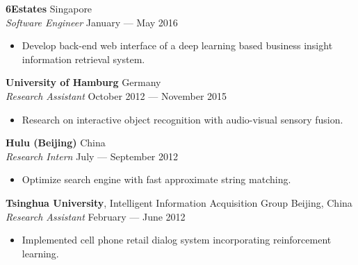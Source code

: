 \documentclass[a4paper,9pt]{article} %
\begin{document}

\textbf{6Estates}  \hfill Singapore \\
\textit{Software Engineer} \hfill January --- May 2016%
\vspace{-.9\parskip}
\begin{itemize}
  \item Develop back-end web interface of a deep learning based business insight information retrieval system.
\end{itemize}


\textbf{University of Hamburg} \hfill Germany \\
\textit{Research Assistant}  \hfill October 2012 --- November 2015%
\vspace{-.9\parskip}
\begin{itemize}
  \item Research on interactive object recognition with audio-visual sensory fusion.
\end{itemize}


\textbf{Hulu (Beijing)} \hfill China \\
\textit{Research Intern} \hfill July --- September 2012%
\vspace{-.9\parskip}
\begin{itemize}
  \item Optimize search engine with fast approximate string matching.
\end{itemize}


\iffalse{}

\textbf{Tsinghua University}, Intelligent Information Acquisition Group \hfill Beijing, China \\
\textit{Research Assistant} \hfill February --- June 2012
\vspace{-\parskip}
\begin{itemize}
  \item Implemented cell phone retail dialog system incorporating reinforcement learning.
\end{itemize}
\end{document}
